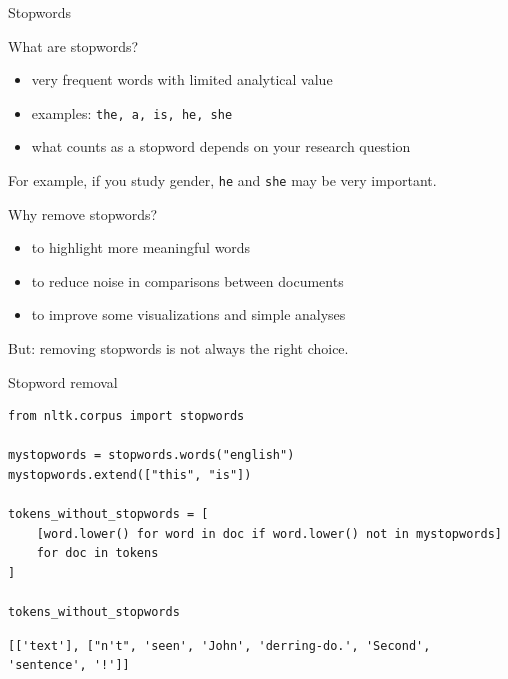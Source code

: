\documentclass[handout]{beamer}
\begin{document}
\begin{frame}{Stopwords}
\begin{block}{What are stopwords?}
\begin{itemize}
	\item very frequent words with limited analytical value
	\item examples: \texttt{the, a, is, he, she}
	\item what counts as a stopword depends on your research question
\end{itemize}
\end{block}

\vspace{0.3cm}
For example, if you study gender, \texttt{he} and \texttt{she} may be very important.
\end{frame}

\begin{frame}{Why remove stopwords?}
\begin{itemize}
	\item to highlight more meaningful words
	\item to reduce noise in comparisons between documents
	\item to improve some visualizations and simple analyses
\end{itemize}

\vspace{0.3cm}
But: removing stopwords is not always the right choice.
\end{frame}

\begin{frame}[fragile]{Stopword removal}
\begin{verbatim}
from nltk.corpus import stopwords

mystopwords = stopwords.words("english")
mystopwords.extend(["this", "is"])

tokens_without_stopwords = [
    [word.lower() for word in doc if word.lower() not in mystopwords]
    for doc in tokens
]

tokens_without_stopwords
\end{verbatim}

\begin{verbatim}
[['text'], ["n't", 'seen', 'John', 'derring-do.', 'Second', 'sentence', '!']]
\end{verbatim}
\end{frame}
\end{document}
